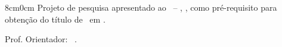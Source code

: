 \newpage

\setcounter{page}{1}

\begin{center}

\MakeUppercase{\textbf{\universidade}}

\MakeUppercase{\textbf{\campus}}

\MakeUppercase{\textbf{\instituto}}

\MakeUppercase{\textbf{\curso}}

\vspace{2cm}

\MakeUppercase{\textbf{\imprimirautor}}

\vspace{2cm}

\MakeUppercase{\textbf{\imprimirtitulo}}


\vspace{1.5cm}
    
\end{center}

\begin{adjustwidth}{8cm}{0cm}
    Projeto de pesquisa apresentado ao \curso \ – \sigla, \campus, como pré-requisito para obtenção do título de \ensino \ em \nomecurso.
    
    Prof. Orientador: \titulacao \ \orientador.
\end{adjustwidth}

\begin{center}

\vspace{4cm}

\MakeUppercase{\textbf{\imprimirlocal}}

\MakeUppercase{\textbf{\ano}}
    
\end{center}